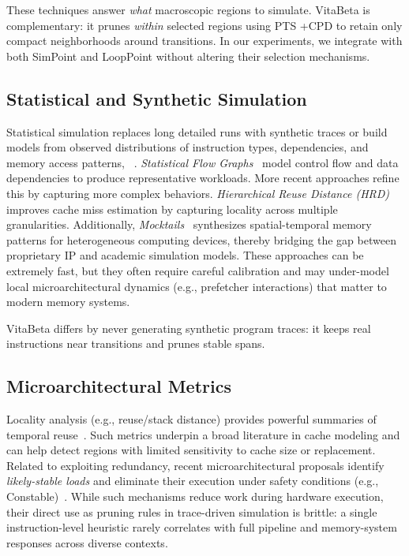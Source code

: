 \documentclass[conference]{IEEEtran}
\newcommand{\name}{VitaBeta }
\newcommand{\pts}{\textsc{PTS} }
\newcommand{\cpd}{\textsc{CPD} }
\begin{document}
These techniques answer \emph{what} macroscopic regions to simulate. \name is complementary: it prunes \emph{within} selected regions using \pts+\cpd to retain only compact neighborhoods around transitions.
In our experiments, we integrate with both SimPoint and LoopPoint without altering their selection mechanisms.

\subsection{Statistical and Synthetic Simulation}
Statistical simulation replaces long detailed runs with synthetic traces or build models from observed distributions of instruction types, dependencies, and memory access patterns, ~\cite{nussbaum-pact01,controlflow-isca04}. \emph{Statistical Flow Graphs}~\cite{wunderlich2003smarts} model control flow and data dependencies to produce representative workloads. {More recent approaches refine this by capturing more complex behaviors}. \emph{Hierarchical Reuse Distance (HRD)}~\cite{hrd} improves cache miss estimation by capturing locality across multiple granularities. Additionally, \emph{Mocktails}~\cite{mocktails} synthesizes spatial-temporal memory patterns for heterogeneous computing devices, thereby bridging the gap between proprietary IP and academic simulation models.  These approaches can be extremely fast, but they often require careful calibration and may under-model local microarchitectural dynamics (e.g., prefetcher  interactions) that matter to modern memory systems.  

\name differs by never generating synthetic program traces: it keeps real instructions near transitions and prunes stable spans.

\subsection{Microarchitectural Metrics}
Locality analysis (e.g., reuse/stack distance) provides powerful summaries of temporal reuse~\cite{mattson1970,benkruskal1975}. Such metrics underpin a broad literature in cache modeling and can help detect regions with limited sensitivity to cache size or replacement. Related to exploiting redundancy, recent microarchitectural proposals identify \emph{likely-stable loads} and eliminate their execution under safety conditions (e.g., Constable)~\cite{constable}. While such mechanisms reduce work during hardware execution, their direct use as pruning rules in trace-driven simulation is brittle: a single instruction-level heuristic rarely correlates with full pipeline and memory-system responses across diverse contexts. 
\end{document}
